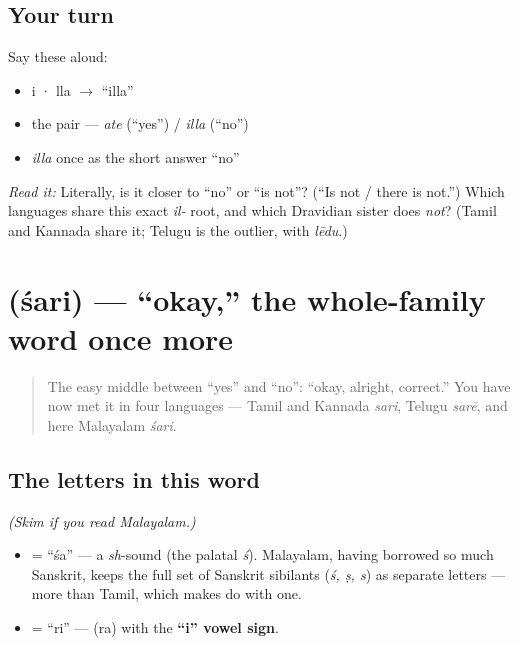 \subsection*{Your turn}
Say these aloud:

\begin{itemize}
\raggedright
  \item i · lla $\to$ \textquotedblleft{}illa\textquotedblright{}
  \item the pair — \emph{ate} (\textquotedblleft{}yes\textquotedblright{}) / \emph{illa} (\textquotedblleft{}no\textquotedblright{})
  \item \emph{illa} once as the short answer \textquotedblleft{}no\textquotedblright{}
\end{itemize}

\begin{tcolorbox}[breakable,colback=teal!4,colframe=teal!35!black,title={Before you move on}]
\emph{Read it:} \textbf{} Literally, is it closer to \textquotedblleft{}no\textquotedblright{} or \textquotedblleft{}is not\textquotedblright{}? (\textquotedblleft{}Is not / there is not.\textquotedblright{}) Which languages share this exact \emph{il-} root, and which Dravidian sister does \emph{not}? (Tamil and Kannada share it; Telugu is the outlier, with \emph{lēdu}.)
\end{tcolorbox}
\section[\texorpdfstring{\ml{ശരി} (śari)}{ശരി (śari)}]{ (śari) — \textquotedblleft{}okay,\textquotedblright{} the whole-family word once more}

\label{lesson:ML-C01-sari}



\begin{quote}
The easy middle between \textquotedblleft{}yes\textquotedblright{} and \textquotedblleft{}no\textquotedblright{}: \textquotedblleft{}okay, alright, correct.\textquotedblright{} You have now met it in four languages — Tamil and Kannada \emph{sari}, Telugu \emph{sarē}, and here Malayalam \emph{śari}.
\end{quote}

\subsection*{The letters in this word}
\emph{(Skim if you read Malayalam.)}

\begin{itemize}
\raggedright
  \item \textbf{} = \textquotedblleft{}śa\textquotedblright{} — a \emph{sh}-sound (the palatal \emph{ś}). Malayalam, having borrowed so much Sanskrit, keeps the full set of Sanskrit sibilants (\emph{ś, ṣ, s}) as separate letters — more than Tamil, which makes do with one.
  \item \textbf{} = \textquotedblleft{}ri\textquotedblright{} — \textbf{} (ra) with the \textbf{\textquotedblleft{}i\textquotedblright{} vowel sign}.
\end{itemize}

